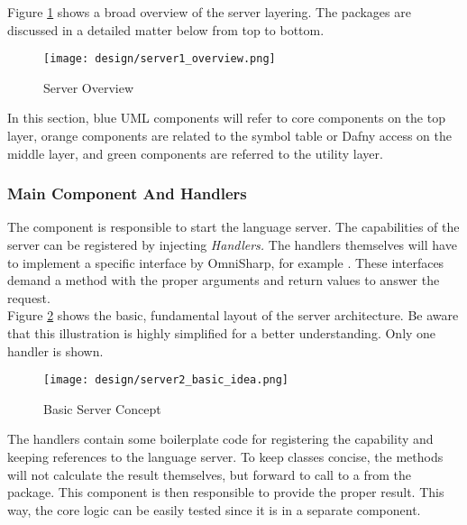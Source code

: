 Figure \ref{fig:server_overview} shows a broad overview of the server layering.
The packages are discussed in a detailed matter below from top to bottom.

\begin{figure}[H]
    \centering
    \texttt{[image: design/server1\_overview.png]}
    \caption{Server Overview}
    \label{fig:server_overview}
\end{figure}
In this section, blue UML components will refer to core components on the top layer,
orange components are related to the symbol table or Dafny access on the middle layer,
and green components are referred to the utility layer.


\subsubsection{Main Component And Handlers}
The  component is responsible to start the language server.
The capabilities of the server can be registered by injecting \textit{Handlers.}
The handlers themselves will have to implement a specific interface by OmniSharp, for example .
These interfaces demand a  method with the proper arguments and return values to answer the request.\\

Figure \ref{fig:server_basic_idea} shows the basic, fundamental layout of the server architecture.
Be aware that this illustration is highly simplified for a better understanding.
Only one handler is shown.\\

\begin{figure}[H]
    \centering
    \texttt{[image: design/server2\_basic\_idea.png]}
    \caption{Basic Server Concept}
    \label{fig:server_basic_idea}
\end{figure}

The handlers contain some boilerplate code for registering the capability and keeping references to the language server.
To keep classes concise, the  methods will not calculate the result themselves, but forward to call to a  from the  package.
This component is then responsible to provide the proper result.
This way, the core logic can be easily tested since it is in a separate component.\\

